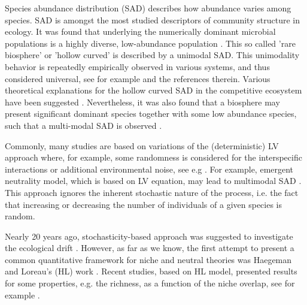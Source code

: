 \documentclass[%
 amsmath,amssymb,
 reprint,%
]{revtex4-2}
\begin{document}
Species abundance distribution (SAD) describes how abundance varies among species. SAD is amongst the most studied descriptors of community structure in ecology.
It was found that underlying the numerically dominant microbial populations is a highly diverse, low-abundance population \cite{lynch2015ecology}. This so called 'rare biosphere' or 'hollow curved' is described by a unimodal SAD.  This unimodality behavior is repeatedly empirically observed in various systems, and thus considered universal, see for example \cite{mcgill2007species,magurran2013measuring} and the references therein. Various theoretical explanations for the hollow curved SAD in the competitive ecosystem have been suggested \cite{mcgill2007species,magurran2013measuring}. 
Nevertheless, it was also found that a biosphere may present significant dominant species together with some low abundance species, such that a multi-modal SAD is observed  \cite{hanski1982dynamics,scheiner1997placing,loreau1999immigration,segura2013competition,zhang2020lifting,vergnon2012emergent}.  

Commonly, many studies are
based on variations of the (deterministic) LV approach where, for example, some randomness is
considered for the interspecific interactions or additional environmental noise, see e.g
\cite{lynch2015ecology,verberk2011explaining,fowler2013colonization,barabas2016effect,tilman1982resource}. For example, emergent neutrality model, which is based on LV equation, may lead to multimodal SAD \cite{vergnon2012emergent,scheffer2006self}.  This approach ignores the inherent stochastic nature of the process, i.e. the fact that increasing or decreasing the number of individuals of a given species is random.

Nearly 20 years ago, stochasticity-based approach was suggested to investigate the ecological
drift \cite{hubbell2001unified,alonso2006merits}. However, as far as we know, the first attempt to present a common quantitative
framework for niche and neutral theories was Haegeman and Loreau’s (HL) work \cite{haegeman2011mathematical}. %
Recent studies,
based on HL model, presented results for some properties, e.g. the richness, as a function of the niche overlap, see for example \cite{capitan2015similar,capitan2017stochastic,capitan2020competitive}. %
\end{document}
